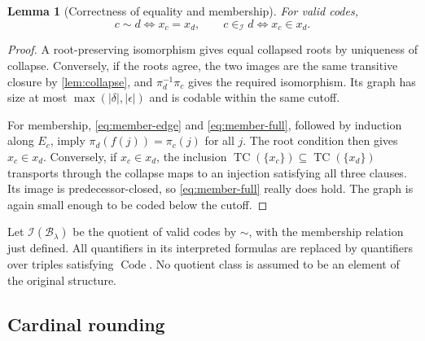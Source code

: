 \documentclass[11pt,letterpaper]{article}
\newtheorem{lemma}[theorem]{Lemma}
\theoremstyle{definition}
\theoremstyle{remark}
\newcommand{\TC}{\operatorname{TC}}
\newcommand{\B}{\mathcal B}
\newcommand{\I}{\mathcal I}
\newcommand{\Code}{\operatorname{Code}}
\newcommand{\card}[1]{\lvert#1\rvert}
\begin{document}
\begin{lemma}[Correctness of equality and membership]
\label{lem:equal-member}
For valid codes,
\[
 c\sim d\iff x_c=x_d,
 \qquad
 c\in_\I d\iff x_c\in x_d.
\]
\end{lemma}
\begin{proof}
A root-preserving isomorphism gives equal collapsed roots by uniqueness of
collapse. Conversely, if the roots agree, the two images are the same
transitive closure by \cref{lem:collapse}, and
$\pi_d^{-1}\pi_c$ gives the required isomorphism. Its graph has size at most
$\max(\card\delta,\card\epsilon)$ and is codable within the same cutoff.

For membership, \eqref{eq:member-edge} and \eqref{eq:member-full}, followed
by induction along $E_c$, imply
$\pi_d(f(j))=\pi_c(j)$ for all $j$. The root condition then gives
$x_c\in x_d$. Conversely, if $x_c\in x_d$, the inclusion
$\TC(\{x_c\})\subseteq\TC(\{x_d\})$ transports through the collapse maps to
an injection satisfying all three clauses. Its image is predecessor-closed,
so \eqref{eq:member-full} really does hold. The graph is again small enough
to be coded below the cutoff.
\end{proof}

Let $\I(\B_\lambda)$ be the quotient of valid codes by $\sim$, with the
membership relation just defined. All quantifiers in its interpreted
formulas are replaced by quantifiers over triples satisfying $\Code$.
No quotient class is assumed to be an element of the original structure.

\subsection{Cardinal rounding}
\end{document}
